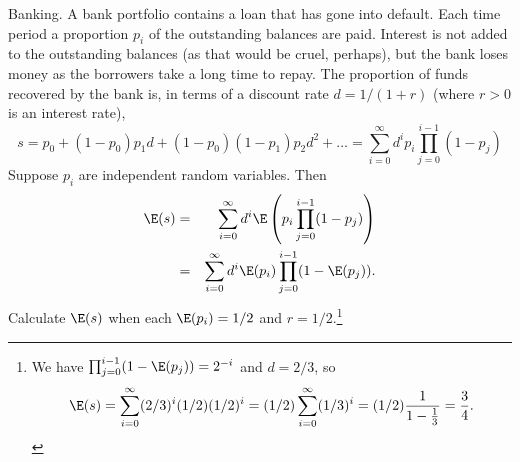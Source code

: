 \begin{example}{Banking.}
	A bank portfolio contains a loan that has gone into default.
	Each time period a proportion $p_i$ of the outstanding balances are paid.
	Interest is not added to the outstanding balances (as that would be cruel, perhaps), but the bank loses money as the borrowers take a long time to repay.
	The proportion of funds recovered by the bank is, in terms of a discount rate $d=1/(1+r)$ (where $r>0$ is an interest rate),
	\[
		s = p_0 + (1-p_0)p_1d + (1-p_0)(1-p_1)p_2d^2+\dots = \sum_{i=0}^\infty d^i p_i\prod_{j=0}^{i-1} (1-p_j)
	\]
	Suppose $p_i$ are independent random variables. Then
	\begin{eqnarray*}
		\E(s)&=&\sum_{i=0}^\infty d^i \E\left(p_i\prod_{j=0}^{i-1} (1-p_j)\right)\\
		&=& \sum_{i=0}^\infty d^i \E(p_i)\prod_{j=0}^{i-1} (1-\E(p_j)).
	\end{eqnarray*}
	Calculate $\E(s)$ when each $\E(p_i)=1/2$ and $r=1/2$.\footnote{We have $\prod_{j=0}^{i-1}(1-\E(p_j))=2^{-i}$ and $d=2/3$, so
	\[
		\E(s)=\sum_{i=0}^\infty (2/3)^i (1/2)(1/2)^i = (1/2)\sum_{i=0}^\infty (1/3)^i = (1/2)\frac1{1-\frac13} = \frac34.
	\]
	}
\end{example}

